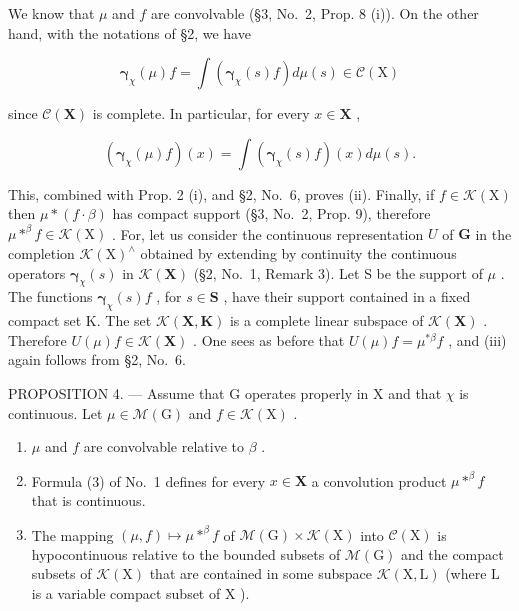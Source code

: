 We know that \(\mu\) and \(f\) are convolvable (§3, No.~2, Prop. 8 (i)). On the other hand, with the notations of §2, we have

\[
\boldsymbol {\gamma} _ {\chi} (\mu) f = \int \left(\boldsymbol {\gamma} _ {\chi} (s) f\right) d \mu (s) \in \mathcal {C} (\mathrm{X})
\]

since \(\mathcal{C}(\mathbf{X})\) is complete. In particular, for every \(x\in \mathbf{X}\) ,

\[
\left(\boldsymbol {\gamma} _ {\chi} (\mu) f\right) (x) = \int \left(\boldsymbol {\gamma} _ {\chi} (s) f\right) (x) d \mu (s).
\]

This, combined with Prop. 2 (i), and §2, No.~6, proves (ii). Finally, if \(f \in \mathcal{K}(\mathrm{X})\) then \(\mu * (f \cdot \beta)\) has compact support (§3, No.~2, Prop. 9), therefore \(\mu *^{\beta} f \in \mathcal{K}(\mathrm{X})\) . For, let us consider the continuous representation \(U\) of \(\mathbf{G}\) in the completion \(\mathcal{K}(\mathrm{X})^{\wedge}\) obtained by extending by continuity the continuous operators \(\pmb{\gamma}_{\chi}(s)\) in \(\mathcal{K}(\mathbf{X})\) (§2, No.~1, Remark 3). Let S be the support of \(\mu\) . The functions \(\pmb{\gamma}_{\chi}(s)f\) , for \(s \in \mathbf{S}\) , have their support contained in a fixed compact set K. The set \(\mathcal{K}(\mathbf{X}, \mathbf{K})\) is a complete linear subspace of \(\mathcal{K}(\mathbf{X})\) . Therefore \(U(\mu)f \in \mathcal{K}(\mathbf{X})\) . One sees as before that \(U(\mu)f = \mu^{*\beta}f\) , and (iii) again follows from §2, No.~6.

PROPOSITION 4. --- Assume that G operates properly in X and that \(\chi\) is continuous. Let \(\mu \in \mathcal{M}(\mathrm{G})\) and \(f \in \mathcal{K}(\mathrm{X})\) .

\begin{enumerate}
\def\labelenumi{(\roman{enumi})}
\item
  \(\mu\) and \(f\) are convolvable relative to \(\beta\) .
\item
  Formula (3) of No.~1 defines for every \(x \in \mathbf{X}\) a convolution product \(\mu *^{\beta}f\) that is continuous.
\item
  The mapping \((\mu, f) \mapsto \mu *^{\beta}f\) of \(\mathcal{M}(\mathrm{G}) \times \mathcal{K}(\mathrm{X})\) into \(\mathcal{C}(\mathrm{X})\) is hypocontinuous relative to the bounded subsets of \(\mathcal{M}(\mathrm{G})\) and the compact subsets of \(\mathcal{K}(\mathrm{X})\) that are contained in some subspace \(\mathcal{K}(\mathrm{X}, \mathrm{L})\) (where \(\mathrm{L}\) is a variable compact subset of \(\mathrm{X}\) ).
\end{enumerate}

